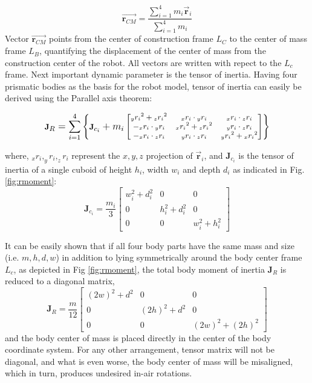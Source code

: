 \begin{equation}\label{eq:CMrobot}
\vec{\textbf{r}_{CM}}=\frac{\sum_{i=1}^{4}m_i\vec{\textbf{r}}_i}{\sum_{i=1}^{4}m_i}
\end{equation}
Vector $\vec{\textbf{r}_{CM}}$ points from the center of construction frame $L_C$ to the center of mass frame $L_B$, quantifying the displacement of the center of mass from the construction center of the robot. All vectors are written with repect to the $L_c$ frame. Next important dynamic parameter is the tensor of inertia. Having four prismatic bodies as the basis for the robot model, tensor of inertia can easily be derived using the Parallel axis theorem:

\begin{equation}
\footnotesize
\textbf{J}_R=\sum_{i=1}^{4}\left \{\textbf{J}_{c_i}+m_i\begin{bmatrix}
{_yr_i}^2+{_zr_i}^2 & {_xr_i}\cdot {_yr_i} & {_xr_i}\cdot {_zr_i} \\ 
-{_xr_i}\cdot {_yr_i} & {_xr_i}^2+{_zr_i}^2 & {_yr_i}\cdot {_zr_i}\\ 
-{_xr_i}\cdot {_zr_i} & {_yr_i}\cdot {_zr_i} & {_yr_i}^2+{_xr_i}^2
\end{bmatrix} \right \}
\normalsize
\end{equation}

where, $_xr_i, _yr_i, _zr_i$ represent the $x,y,z$ projection of $\vec{\textbf{r}}_i$, and $\textbf{J}_{c_i}$ is the tensor of inertia of a single cuboid of height $h_i$, width $w_i$ and depth $d_i$ as indicated in Fig. \ref{fig:rmoment}:
\begin{equation}
\textbf{J}_{c_i}=\frac{m_i}{3}\begin{bmatrix}
w_i^2+d_i^2 &0&0 \\ 
0 &h_i^2+d_i^2&0\\ 
0 &0& w_i^2+h_i^2
\end{bmatrix}
\end{equation} 

It can be easily shown that if all four body parts have the same mass and size (i.e. $m,h,d,w$) in addition to lying symmetrically around the body center frame $L_c$, as depicted in Fig \ref{fig:rmoment}, the total body moment of inertia $\textbf{J}_R$ is reduced to a diagonal matrix,
\begin{equation}
\textbf{J}_{R}=\frac{m}{12}\begin{bmatrix}
(2w)^2+d^2 &0&0 \\ 
0 &(2h)^2+d^2&0\\ 
0 &0& (2w)^2+(2h)^2
\end{bmatrix}
\end{equation} 
and the body center of mass is placed directly in the center of the body coordinate system. For any other arrangement, tensor matrix will not be diagonal, and what is even worse, the body center of mass will be misaligned, which in turn, produces undesired in-air rotations.

